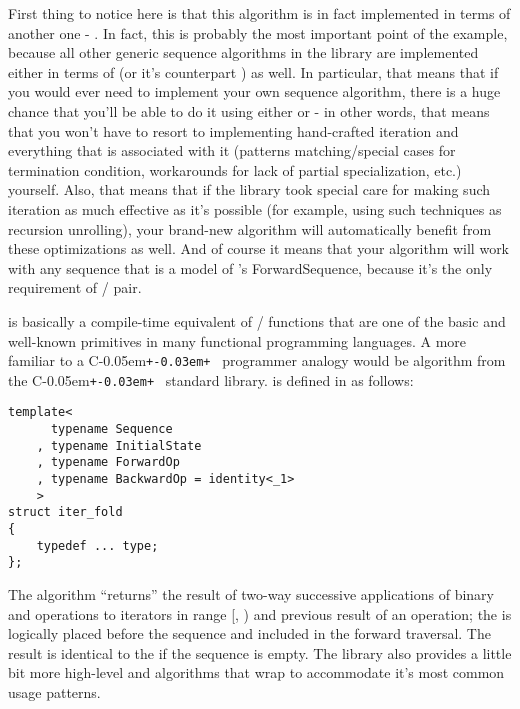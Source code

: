 \documentclass{kapproc}
\newcommand{\Cpp}{C\kern-0.05em\texttt{+\kern-0.03em+}%
}
\begin{document}
First thing to notice here is that this algorithm is in fact 
implemented in terms of another one - . 
In fact, this is probably the most important point of the 
example, because all other generic sequence algorithms in 
the library are implemented either in terms of 
(or it's counterpart ) as well. In particular, 
that means that if you would ever need to implement your own 
sequence algorithm, there is a huge chance that you'll be able 
to do it using either  or  - 
in other words, that means that you won't have to resort to 
implementing hand-crafted iteration and everything that is 
associated with it (patterns matching/special cases for 
termination condition, workarounds for lack of partial 
specialization, etc.) yourself. Also, that means that if the 
library took special care for making such iteration as much 
effective as it's possible (for example, using such techniques 
as recursion unrolling), your brand-new algorithm will 
automatically benefit from these optimizations as well. And of 
course it means that your algorithm will work with any 
sequence that is a model of 's 
ForwardSequence, because it's the only requirement of 
/ pair.

 is basically a compile-time equivalent of 
/ functions that are one of the basic 
and well-known primitives in many functional programming 
languages. A more familiar to a \Cpp\ programmer analogy would 
be  algorithm from the \Cpp\ standard 
library.  is defined in  
as follows:

{\small
\begin{codesamp}\begin{verbatim}
template<
      typename Sequence
    , typename InitialState
    , typename ForwardOp
    , typename BackwardOp = identity<_1>
    >
struct iter_fold
{
    typedef ... type;
};
\end{verbatim}
\end{codesamp}
}


The algorithm ``returns'' the result of two-way successive 
applications of binary  and 
operations to iterators in range 
[, ) 
and previous result of an operation; 
the  is logically placed before the 
sequence and included in the forward traversal. The result 
 is identical to the  if the 
sequence is empty. 
The library also provides a little bit more high-level 
 and  algorithms that wrap 
 to accommodate it's most common usage 
patterns.
\end{document}
